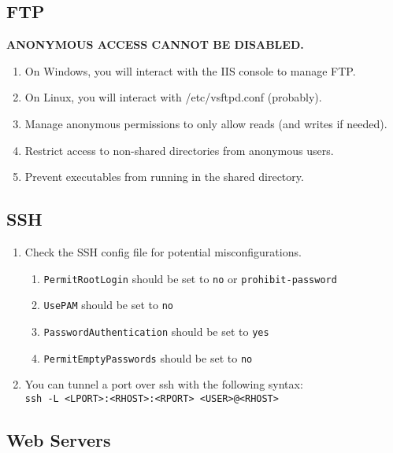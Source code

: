\documentclass[12pt,letterpaper]{article}
\def\code#1{\textcolor{iris}{\texttt{#1}}}
\def\bf#1{\textbf{#1}}
\begin{document}
\subsection{FTP}

\bf{ANONYMOUS ACCESS CANNOT BE DISABLED.}

\begin{enumerate}
	\item On Windows, you will interact with the IIS console to manage FTP.
	\item On Linux, you will interact with /etc/vsftpd.conf (probably).
	\item Manage anonymous permissions to only allow reads (and writes if needed).
	\item Restrict access to non-shared directories from anonymous users.
	\item Prevent executables from running in the shared directory.
\end{enumerate}

\subsection{SSH}

\begin{enumerate}
	\item Check the SSH config file for potential misconfigurations.
	\begin{enumerate}
		\item \code{PermitRootLogin} should be set to \code{no} or \code{prohibit-password}
		\item \code{UsePAM} should be set to \code{no}
		\item \code{PasswordAuthentication} should be set to \code{yes}
		\item \code{PermitEmptyPasswords} should be set to \code{no}
	\end{enumerate}
	\item You can tunnel a port over ssh with the following syntax: \\
		\code{ssh -L <LPORT>:<RHOST>:<RPORT> <USER>@<RHOST>}
\end{enumerate}

\subsection{Web Servers}
\end{document}
